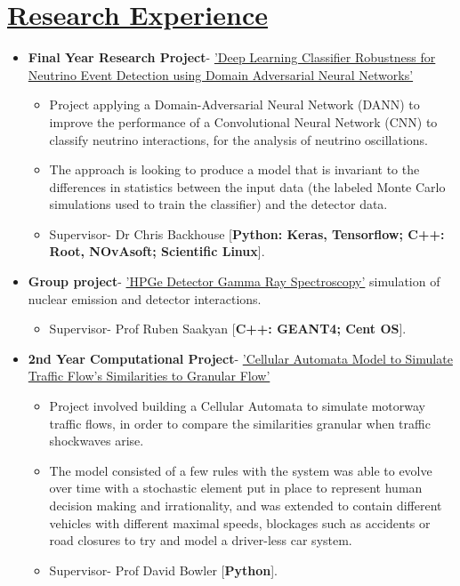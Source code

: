 \documentclass[10pt,a4paper,roman]{moderncv}        %
\begin{document}
\section{\href{https://www.ira-shokar.co.uk/projects/}{Research Experience}}

{\begin{itemize} \item \textbf{Final Year Research Project}- \href{https://www.ira-shokar.co.uk/Docs/Formal_Report.pdf}{'Deep Learning Classifier Robustness for Neutrino Event Detection using Domain Adversarial Neural Networks'} {\begin{itemize} \item Project applying a Domain-Adversarial Neural Network (DANN) to improve the performance of a Convolutional Neural Network (CNN) to classify neutrino interactions, for the analysis of neutrino oscillations. 
    \item The approach is looking to produce a model that is invariant to the differences in statistics between the input data (the labeled Monte Carlo simulations used to train the classifier) and the detector data.
    \item Supervisor- Dr Chris Backhouse [\textbf{Python: Keras, Tensorflow; C++: Root, NOvAsoft; Scientific Linux}].
    \end{itemize}}
                            \item \textbf{Group project}- \href{https://www.ira-shokar.co.uk/Docs/Final_Report_-_Nuclear_Forensics_with_Gamma_Ray_Spectroscopy.pdf}{'HPGe Detector Gamma Ray Spectroscopy'} simulation of nuclear emission and detector interactions.
                     {\begin{itemize}       \item Supervisor- Prof Ruben Saakyan [\textbf{C++: GEANT4; Cent OS}].
                     \end{itemize}}
                            \item \textbf{2nd Year Computational Project}- \href{https://github.com/Ira-Shokar/CA-Traffic}{'Cellular Automata Model to Simulate Traffic Flow's Similarities to Granular Flow’}  {\begin{itemize} \item Project involved building a Cellular Automata to simulate motorway traffic flows, in order to compare the similarities granular when traffic shockwaves arise.
    \item The model consisted of a few rules with the system was able to evolve over time with a stochastic element put in place to represent human decision making and irrationality, and was extended to contain different vehicles with different maximal speeds, blockages such as accidents or road closures to try and model a driver-less car system.​
    \item Supervisor- Prof David Bowler [\textbf{Python}].
      \end{itemize}}
\end{itemize}}
  
\end{document}

